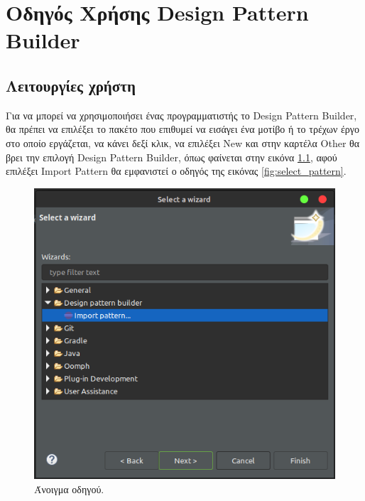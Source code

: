 \chapter{Οδηγός Χρήσης Design Pattern Builder}
\label{ch:manual}


\section{Λειτουργίες χρήστη}
\label{sec:manual}
Για να μπορεί να χρησιμοποιήσει ένας προγραμματιστής το Design Pattern Builder, θα πρέπει να επιλέξει το πακέτο που επιθυμεί να εισάγει 
ένα μοτίβο ή το τρέχων έργο στο οποίο εργάζεται, να κάνει δεξί κλικ, να επιλέξει New και στην καρτέλα 
Other θα βρει την επιλογή Design Pattern Builder, όπως φαίνεται στην εικόνα \ref{fig:open_wizard}, 
αφού επιλέξει Import Pattern θα εμφανιστεί ο οδηγός της εικόνας \ref{fig:select_pattern}.
\begin{figure}[H]
    \centering
    \includegraphics[width=1.0\textwidth]{Figures/open_wizard.png}
    \caption{Άνοιγμα οδηγού.}
    \label{fig:open_wizard}
\end{figure}
